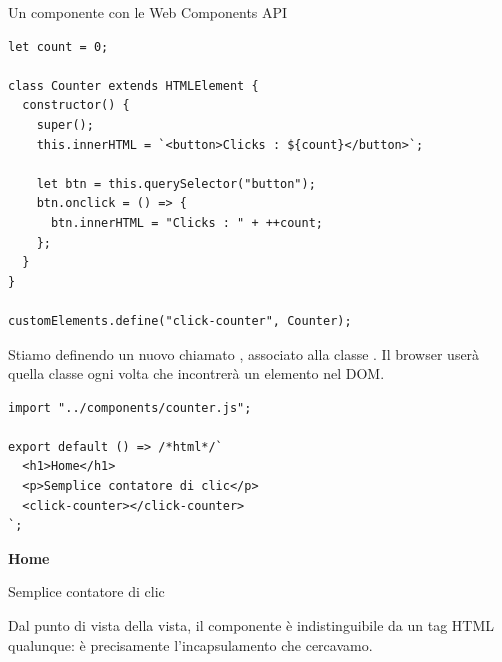 \begin{esempio}{Un componente con le Web Components API}
\begin{affianco}[0.5][c]
\codicepiccolo
\begin{lstlisting}[style=js, name=components/counter.js]
let count = 0;

class Counter extends HTMLElement {
  constructor() {
    super();
    this.innerHTML = `<button>Clicks : ${count}</button>`;

    let btn = this.querySelector("button");
    btn.onclick = () => {
      btn.innerHTML = "Clicks : " + ++count;
    };
  }
}

customElements.define("click-counter", Counter);
\end{lstlisting}
\risultato
\begin{immagine}
\end{immagine}
\end{affianco}

Stiamo definendo un nuovo  chiamato ,
associato alla classe . Il browser userà quella classe ogni volta
che incontrerà un elemento  nel DOM.

\begin{affianco}[0.42][c]
\begin{lstlisting}[style=js, name=views/home.js]
import "../components/counter.js";

export default () => /*html*/`
  <h1>Home</h1>
  <p>Semplice contatore di clic</p>
  <click-counter></click-counter>
`;
\end{lstlisting}
\risultato
\begin{browser}[localhost:5173]
  \enspace{}\enspace{}
  \par\vspace{4pt}
  {\Lora\bfseries\LARGE Home\par}\vspace{6pt}
  Semplice contatore di clic\par\vspace{6pt}
\end{browser}
\end{affianco}

Dal punto di vista della vista, il componente è indistinguibile da un tag HTML
qualunque: è precisamente l'incapsulamento che cercavamo.
\end{esempio}

